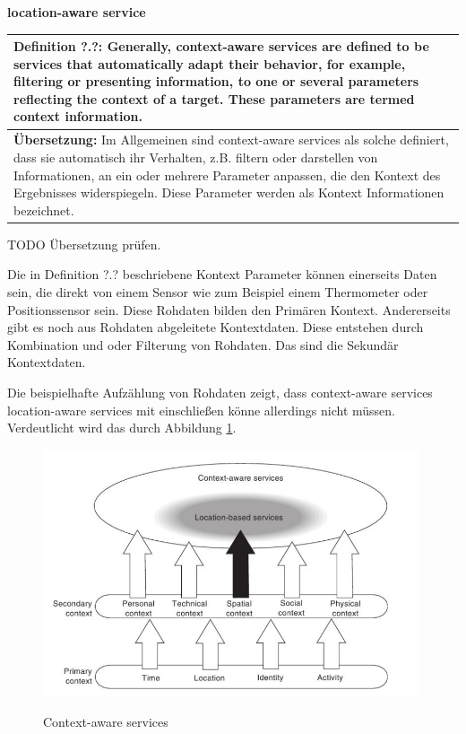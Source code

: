 \textbf{location-aware service} \\
\begin{table}[h]
	\centering
	\begin{tabular}{|p{16cm}|}\hline
		\textbf{Definition ?.?:} \glqq Generally, context-aware services are defined to be services that automatically adapt their behavior, for example, filtering or presenting information, to one or several parameters reflecting the context of a target. These parameters are termed context information.\grqq \cite[S.2]{Kuepper2005}\\ \hline
		\textbf{Übersetzung:} Im Allgemeinen sind context-aware services als solche definiert, dass sie automatisch ihr Verhalten, z.B. filtern oder darstellen von Informationen, an ein oder mehrere Parameter anpassen, die den Kontext des Ergebnisses widerspiegeln. Diese Parameter werden als Kontext Informationen bezeichnet. \\ \hline
	\end{tabular}
\end{table}

TODO Übersetzung prüfen.

Die in Definition ?.? beschriebene Kontext Parameter können einerseits Daten sein, die direkt von einem Sensor wie zum Beispiel einem Thermometer oder Positionssensor sein. Diese Rohdaten bilden den Primären Kontext. Andererseits gibt es noch aus Rohdaten abgeleitete Kontextdaten. Diese entstehen durch Kombination und oder Filterung von Rohdaten. Das sind die Sekundär Kontextdaten.

Die beispielhafte Aufzählung von Rohdaten zeigt, dass context-aware services location-aware services mit einschließen könne allerdings nicht müssen. Verdeutlicht wird das durch Abbildung \ref{fig:context-aware services}.


\begin{figure}[h]
\centering
\includegraphics[width=0.99\textwidth]{ref/images/definitionK.png}
\caption[Context-aware services]{Context-aware services}
\label{fig:context-aware services}
\cite[S. 2]{Kuepper2005}
\end{figure}

